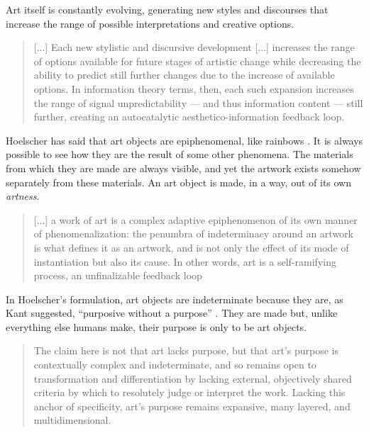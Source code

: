 \documentclass[letterpaper]{article}
\begin{document}
    Art itself is constantly evolving, generating new styles and discourses that increase the range of possible interpretations and creative options.

    \begin{quote}
        [...] Each new stylistic and discursive development [...] increases the range of options available for future stages of artistic change while decreasing the ability to predict still further changes due to the increase of available options. In information theory terms, then, each such expansion increases the range of signal unpredictability — and thus information content — still further, creating an autocatalytic aesthetico-information feedback loop. \citep[p.2]{HoelscherThPtcsOfPhsSpc2014}
    \end{quote}

    Hoelscher has said that art objects are epiphenomenal, like rainbows \citep[p.17]{HoelscherArtAsInfrmtn2021}. It is always possible to see how they are the result of some other phenomena. The materials from which they are made are always visible, and yet the artwork exists somehow separately from these materials. An art object is made, in a way, out of its own \emph{artness}.
    
    \begin{quote}
        [...] a work of art is a complex adaptive epiphenomenon of its own manner of phenomenalization: the penumbra of indeterminacy around an artwork is what defines it as an artwork, and is not only the effect of its mode of instantiation but also its cause. In other words, art is a self-ramifying process, an unfinalizable feedback loop \citep[p.2]{HoelscherThPtcsOfPhsSpc2014}
    \end{quote}

    In Hoelscher's formulation, art objects are indeterminate because they are, as Kant suggested, “purposive without a purpose” \citep[p.57]{KantCrtqOfJdgmnt}. They are made but, unlike everything else humans make, their purpose is only to be art objects. 

    \begin{quote}
        The claim here is not that art lacks purpose, but that art's purpose is contextually complex and indeterminate, and so remains open to transformation and differentiation by lacking external, objectively shared criteria by which to resolutely judge or interpret the work. Lacking this anchor of specificity, art's purpose remains expansive, many layered, and multidimensional.\citep[p.25]{HoelscherThPtcsOfPhsSpc2014}
    \end{quote}
\end{document}
